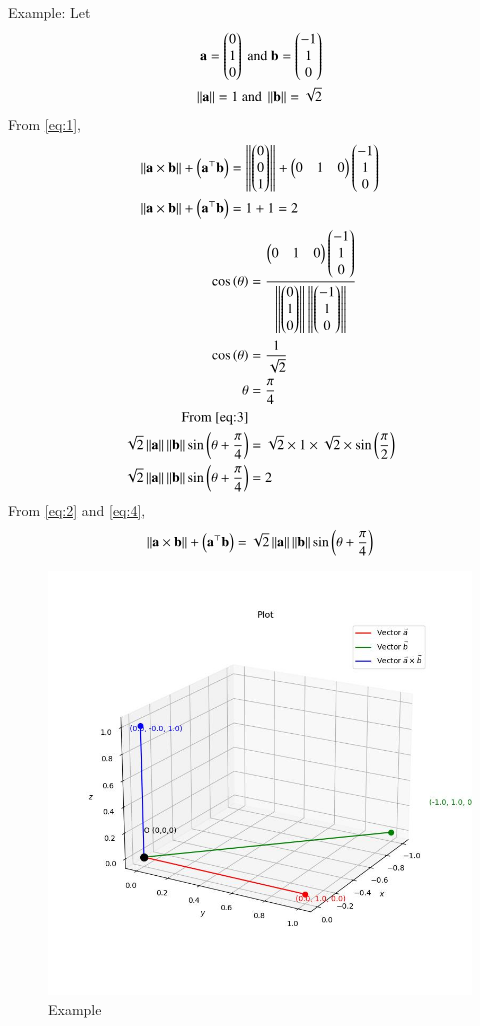 \documentclass[journal]{IEEEtran}
\begin{document}
Example:
Let
\begin{align*}
    \mathbf{a}=\begin{pmatrix}0 \\ 1 \\ 0\end{pmatrix}\text{ and }\mathbf{b}=\begin{pmatrix}-1 \\ 1 \\ 0\end{pmatrix} \\
    \left\lVert\mathbf{a}\right\rVert = 1\text{ and }\left\lVert\mathbf{b}\right\rVert = \sqrt{2} \\
\end{align*}
From \eqref{eq:1},
\begin{align}
    \left\lVert\mathbf{a} \times \mathbf{b}\right\rVert + \left(\mathbf{a}^\top\mathbf{b}\right) &= \left\lVert\begin{pmatrix}0 \\ 0 \\ 1\end{pmatrix}\right\rVert + \begin{pmatrix}0 & 1 &  0\end{pmatrix} \begin{pmatrix}-1 \\ 1 \\ 0\end{pmatrix} \\
    \left\lVert\mathbf{a} \times \mathbf{b}\right\rVert + \left(\mathbf{a}^\top\mathbf{b}\right) &= 1 + 1 = 2 \label{eq:2}
\end{align}
\begin{align}
    \cos\left(\theta\right) &= \frac{\begin{pmatrix}0 & 1 &  0\end{pmatrix} \begin{pmatrix}-1 \\ 1 \\ 0\end{pmatrix}}{\left\lVert\begin{pmatrix}0 \\ 1 \\  0\end{pmatrix}\right\rVert\left\lVert\begin{pmatrix}-1 \\ 1 \\ 0\end{pmatrix}\right\rVert} \\
    \cos\left(\theta\right) &= \frac{1}{\sqrt{2}} \\
    \theta &= \frac{\pi}{4} \label{eq:3} \\
    \text{From \eqref{eq:3}} \\
    \sqrt{2} \left\lVert\mathbf{a}\right\rVert \left\lVert\mathbf{b}\right\rVert \sin\left(\theta + \frac{\pi}{4}\right) &= \sqrt{2} \times 1 \times \sqrt{2} \times \sin\left(\frac{\pi}{2}\right) \\
    \sqrt{2} \left\lVert\mathbf{a}\right\rVert \left\lVert\mathbf{b}\right\rVert \sin\left(\theta + \frac{\pi}{4}\right) &= 2 \label{eq:4}
\end{align}
From \eqref{eq:2} and \eqref{eq:4},
\begin{align*}
\left\lVert\mathbf{a} \times \mathbf{b}\right\rVert + \left(\mathbf{a}^\top\mathbf{b}\right) = \sqrt{2} \left\lVert\mathbf{a}\right\rVert \left\lVert\mathbf{b}\right\rVert \sin\left(\theta + \frac{\pi}{4}\right)
\end{align*}

\begin{figure}[h!]
    \centering
    \includegraphics[width=0.7\columnwidth]{figs/plot_c.jpg}
    \caption*{Example}
    \label{fig:fig}
\end{figure}
\end{document}
